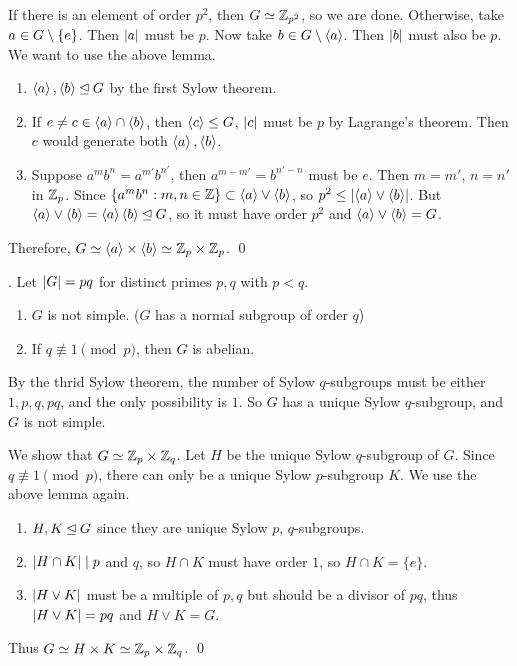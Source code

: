 \pf If there is an element of order \(p^2\), then \(G \simeq \mathbb{Z}_{p^2}\), so we are done. Otherwise, take \(a \in G \setminus \{e\}\). Then \(\left| a \right|\) must be \(p\). Now take \(b \in G \setminus \left\langle a \right\rangle\). Then \(\left| b \right|\) must also be \(p\). We want to use the above lemma.
\begin{enumerate}
    \item \(\left\langle a \right\rangle, \left\langle b \right\rangle \unlhd G\) by the first Sylow theorem.
    \item If \(e \neq c \in \left\langle a \right\rangle \cap \left\langle b \right\rangle\), then \(\left\langle c \right\rangle \leq G\), \(\left| c \right|\) must be \(p\) by Lagrange's theorem. Then \(c\) would generate both \(\left\langle a \right\rangle, \left\langle b \right\rangle\).
    \item Suppose \(a^mb^n = a^{m'}b^{n'}\), then \(a^{m-m'} = b^{n'-n}\) must be \(e\). Then \(m = m'\), \(n = n'\) in \(\mathbb{Z}_p\). Since \(\{a^mb^n : m, n \in \mathbb{Z}\} \subset \left\langle a \right\rangle \vee \left\langle b \right\rangle\), so \(p^2 \leq \left| \left\langle a \right\rangle \vee \left\langle b \right\rangle \right|\). But \(\left\langle a \right\rangle \vee \left\langle b \right\rangle = \left\langle a \right\rangle\left\langle b \right\rangle \unlhd G\), so it must have order \(p^2\) and \(\left\langle a \right\rangle \vee \left\langle b \right\rangle = G\).
\end{enumerate}
Therefore, \(G \simeq \left\langle a \right\rangle \times \left\langle b \right\rangle \simeq \mathbb{Z}_p \times \mathbb{Z}_p\). \qed

\thm. Let \(\left| G \right| = pq\) for distinct primes \(p, q\) with \(p < q\).
\begin{enumerate}
    \item \(G\) is not simple. (\(G\) has a normal subgroup of order \(q\))
    \item If \(q \not\equiv 1 \pmod p\), then \(G\) is abelian.
\end{enumerate}

\pf {} By the thrid Sylow theorem, the number of Sylow \(q\)-subgroups must be either \(1, p, q, pq\), and the only possibility is \(1\). So \(G\) has a unique Sylow \(q\)-subgroup, and \(G\) is not simple.

 We show that \(G \simeq \mathbb{Z}_p \times \mathbb{Z}_q\). Let \(H\) be the unique Sylow \(q\)-subgroup of \(G\). Since \(q \not\equiv 1 \pmod p\), there can only be a unique Sylow \(p\)-subgroup \(K\). We use the above lemma again.
\begin{enumerate}
    \item \(H, K \unlhd G\) since they are unique Sylow \(p\), \(q\)-subgroups.
    \item \(\left| H \cap K \right| \mid p\) and \(q\), so \(H \cap K\) must have order \(1\), so \(H \cap K = \{e\}\).
    \item \(\left| H \vee K \right|\) must be a multiple of \(p, q\) but should be a divisor of \(pq\), thus \(\left| H \vee K \right| = pq\) and \(H \vee K = G\).
\end{enumerate}
Thus \(G \simeq H \times K \simeq \mathbb{Z}_p \times \mathbb{Z}_q\). \qed

